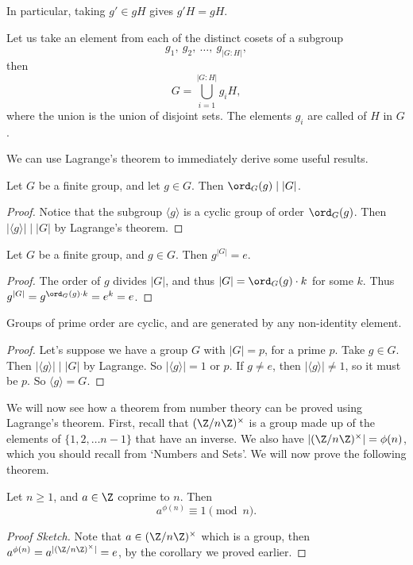 In particular, taking $g' \in gH$ gives $g'H = gH$.

Let us take an element from each of the distinct cosets of a subgroup
$$
g_1,\ g_2, \ \dots, \ g_{|G:H|},
$$
then
$$
G = \bigcup_{i = 1}^{|G:H|} g_i H,
$$
where the union is the union of disjoint sets. The elements $g_i$ are called  of $H$ in $G$. 

We can use Lagrange's theorem to immediately derive some useful results.

\begin{corollary}
	Let $G$ be a finite group, and let $g \in G$. Then $\ord_G(g) \mid |G|$.
\end{corollary}
\begin{proof}
	Notice that the subgroup $\langle g \rangle$ is a cyclic group of order $\ord_G(g)$. Then $|\langle g \rangle|  \mid |G|$ by Lagrange's theorem.
\end{proof}

\begin{corollary}
	Let $G$ be a finite group, and $g \in G$. Then $g^{|G|} = e$.
\end{corollary}
\begin{proof}
	The order of $g$ divides $|G|$, and thus $|G| = \ord_G(g) \cdot k$ for some $k$. Thus $g^{|G|} = g^{\ord_G(g) \cdot k} = e^k = e$.
\end{proof}

\begin{corollary}\label{cor:primecyclic}
	Groups of prime order are cyclic, and are generated by any non-identity element.
\end{corollary}
\begin{proof}
Let's suppose we have a group $G$ with $|G| = p$, for a prime $p$. Take $g \in G$. Then $|\langle g \rangle| \mid |G|$ by Lagrange. So $|\langle g \rangle | = 1$ or $p$. If $g \neq e$, then $|\langle g \rangle |\neq 1$, so it must be $p$. So $\langle g \rangle = G$. 
\end{proof}

We will now see how a theorem from number theory can be proved using Lagrange's theorem. First, recall that $(\Z/n\Z)^\times$ is a group made up of the elements of $\{1, 2, \dots n - 1\}$ that have an inverse. We also have $|(\Z/n\Z)^\times| = \phi(n)$, which you should recall from `Numbers and Sets'. We will now prove the following theorem.

\begin{theorem}
	Let $n \geq 1$, and $a \in \Z$ coprime to $n$. Then
	$$
	a^{\phi(n)} \equiv 1 \pmod{n}.
	$$
\end{theorem}
\begin{proof}[Proof Sketch]
	Note that $a \in (\Z/n\Z)^\times$ which is a group, then $a^{\phi(n)} = a^{| (\Z/n\Z)^\times|} = e$, by the corollary we proved earlier.
\end{proof}

